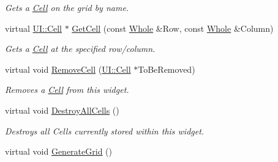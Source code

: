 \begin{DoxyCompactItemize}
\begin{DoxyCompactList}\small\item\em Gets a \hyperlink{classphys_1_1UI_1_1Cell}{Cell} on the grid by name. \item\end{DoxyCompactList}\item 
virtual \hyperlink{classphys_1_1UI_1_1Cell}{UI::Cell} $\ast$ \hyperlink{classphys_1_1UI_1_1CellGrid_a6a39785b673abb8cffc8bbd0b8837208}{GetCell} (const \hyperlink{namespacephys_a460f6bc24c8dd347b05e0366ae34f34a}{Whole} \&Row, const \hyperlink{namespacephys_a460f6bc24c8dd347b05e0366ae34f34a}{Whole} \&Column)
\begin{DoxyCompactList}\small\item\em Gets a \hyperlink{classphys_1_1UI_1_1Cell}{Cell} at the specified row/column. \item\end{DoxyCompactList}\item 
virtual void \hyperlink{classphys_1_1UI_1_1CellGrid_af7ff6b201aa24939c82ee34e96e67a32}{RemoveCell} (\hyperlink{classphys_1_1UI_1_1Cell}{UI::Cell} $\ast$ToBeRemoved)
\begin{DoxyCompactList}\small\item\em Removes a \hyperlink{classphys_1_1UI_1_1Cell}{Cell} from this widget. \item\end{DoxyCompactList}\item 
\hypertarget{classphys_1_1UI_1_1CellGrid_a12736adff3718820b4915cbe9961c66f}{
virtual void \hyperlink{classphys_1_1UI_1_1CellGrid_a12736adff3718820b4915cbe9961c66f}{DestroyAllCells} ()}
\label{classphys_1_1UI_1_1CellGrid_a12736adff3718820b4915cbe9961c66f}

\begin{DoxyCompactList}\small\item\em Destroys all Cells currently stored within this widget. \item\end{DoxyCompactList}\item 
\hypertarget{classphys_1_1UI_1_1CellGrid_a7a990cd514b6c02ea8f7747b0b058c93}{
virtual void \hyperlink{classphys_1_1UI_1_1CellGrid_a7a990cd514b6c02ea8f7747b0b058c93}{GenerateGrid} ()}
\label{classphys_1_1UI_1_1CellGrid_a7a990cd514b6c02ea8f7747b0b058c93}


\end{DoxyCompactItemize}

